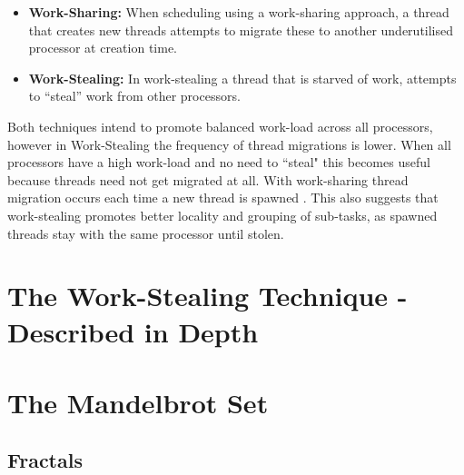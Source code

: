 \begin{itemize}
\item \textbf{Work-Sharing:} When scheduling using a work-sharing approach, a thread that creates new threads
	attempts to migrate these to another underutilised processor at creation time. 
\item \textbf{Work-Stealing:} In work-stealing a thread that is starved of work, attempts to ``steal'' work from other processors. 
\end{itemize}

Both techniques intend to promote balanced work-load across all processors, however in Work-Stealing
the frequency of thread migrations is lower. When all processors have a 
high work-load and no need to ``steal" this becomes useful because threads need not get 
migrated at all. With work-sharing thread migration occurs each time a new thread is spawned \cite[p.~2]{blumleis}.
This also suggests that work-stealing promotes better locality and grouping of sub-tasks, as spawned threads stay with the same 
processor until stolen.



\section{The Work-Stealing Technique - Described in Depth}


\section{The Mandelbrot Set}


\subsection{Fractals}
